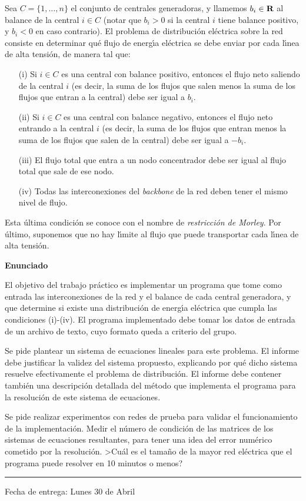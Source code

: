 \documentclass[11pt, a4paper]{article}
\newcommand{\real}{\hbox{\bf R}}
\begin{document}
Sea $C=\{1,\dots,n\}$ el conjunto de centrales generadoras, y llamemos
$b_i\in\real$ al balance de la central $i\in C$ (notar que $b_i>0$ si la
central $i$ tiene balance positivo, y $b_i<0$ en caso contrario). El problema
de distribuci\'on el\'ectrica sobre la red consiste en determinar
qu\'e flujo de energ\'\i a el\'ectrica se debe enviar por cada l\'\i nea
de alta tensi\'on, de manera tal que:
\begin{itemize}
\item[(i)] Si $i\in C$ es una central con balance positivo, entonces el flujo
neto saliendo de la central $i$ (es decir, la suma de los flujos que salen
menos la suma de los flujos que entran a la central) debe ser igual a $b_i$.
\item[(ii)] Si $i\in C$ es una central con balance negativo, entonces el
flujo neto entrando a la central $i$ (es decir, la suma de los flujos que
entran menos la suma de los flujos que salen de la central) debe ser igual
a $-b_i$.
\item[(iii)] El flujo total que entra a un nodo concentrador debe ser igual
al flujo total que sale de ese nodo.
\item[(iv)] Todas las interconexiones del \emph{backbone} de la red deben
tener el mismo nivel de flujo.
\end{itemize}
Esta \'ultima condici\'on se conoce con el nombre de \emph{restricci\'on
de Morley}. Por \'ultimo, su\-po\-ne\-mos que no hay l\'\i mite al flujo que
puede transportar cada l\'\i nea de alta tensi\'on.

\textbf{Enunciado}

El objetivo del trabajo pr\'actico es implementar un programa que tome como
entrada las interconexiones de la red y el balance de cada central
generadora, y que determine si existe una distribuci\'on de energ\'\i a
el\'ectrica que cumpla las condiciones (i)-(iv). El programa implementado
debe tomar los datos de entrada de un archivo de texto, cuyo formato queda
a criterio del grupo.

Se pide plantear un sistema de ecuaciones lineales para este problema.
El informe debe justificar la validez del sistema propuesto, explicando por
qu\'e dicho sistema resuelve efectivamente el problema de distribuci\'on.
El informe debe contener tambi\'en una descripci\'on detallada del m\'etodo
que implementa el programa para la resoluci\'on de este sistema de ecuaciones.

Se pide realizar experimentos con redes de prueba para validar el
funcionamiento de la implementaci\'on. Medir el n\'umero de condici\'on de
las matrices de los sistemas de ecuaciones resultantes, para tener una idea
del error num\'erico cometido por la resoluci\'on. >Cu\'al es el tama\~no
de la mayor red el\'ectrica que el programa puede resolver en 10 minutos
o menos?

\vskip 15pt

\hrule

\vskip 11pt

Fecha de entrega: Lunes 30 de Abril
\end{document}
